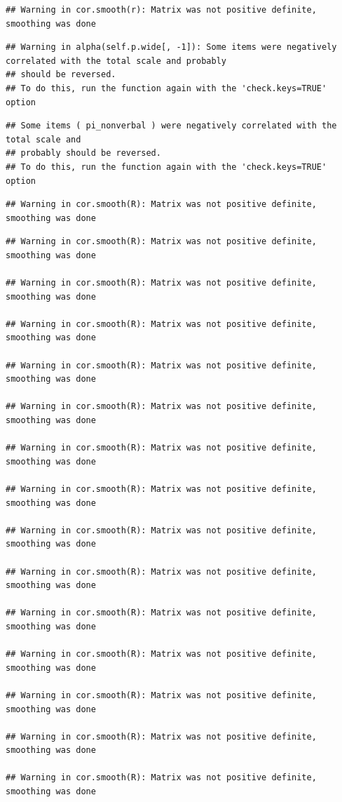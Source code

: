 \documentclass[
  english,
  man,floatsintext]{apa6}
\begin{document}
\begin{verbatim}
## Warning in cor.smooth(r): Matrix was not positive definite, smoothing was done
\end{verbatim}

\begin{verbatim}
## Warning in alpha(self.p.wide[, -1]): Some items were negatively correlated with the total scale and probably 
## should be reversed.  
## To do this, run the function again with the 'check.keys=TRUE' option
\end{verbatim}

\begin{verbatim}
## Some items ( pi_nonverbal ) were negatively correlated with the total scale and 
## probably should be reversed.  
## To do this, run the function again with the 'check.keys=TRUE' option
\end{verbatim}

\begin{verbatim}
## Warning in cor.smooth(R): Matrix was not positive definite, smoothing was done
\end{verbatim}

\begin{verbatim}
## Warning in cor.smooth(R): Matrix was not positive definite, smoothing was done

## Warning in cor.smooth(R): Matrix was not positive definite, smoothing was done

## Warning in cor.smooth(R): Matrix was not positive definite, smoothing was done

## Warning in cor.smooth(R): Matrix was not positive definite, smoothing was done

## Warning in cor.smooth(R): Matrix was not positive definite, smoothing was done

## Warning in cor.smooth(R): Matrix was not positive definite, smoothing was done

## Warning in cor.smooth(R): Matrix was not positive definite, smoothing was done

## Warning in cor.smooth(R): Matrix was not positive definite, smoothing was done

## Warning in cor.smooth(R): Matrix was not positive definite, smoothing was done

## Warning in cor.smooth(R): Matrix was not positive definite, smoothing was done

## Warning in cor.smooth(R): Matrix was not positive definite, smoothing was done

## Warning in cor.smooth(R): Matrix was not positive definite, smoothing was done

## Warning in cor.smooth(R): Matrix was not positive definite, smoothing was done

## Warning in cor.smooth(R): Matrix was not positive definite, smoothing was done
\end{verbatim}
\end{document}
